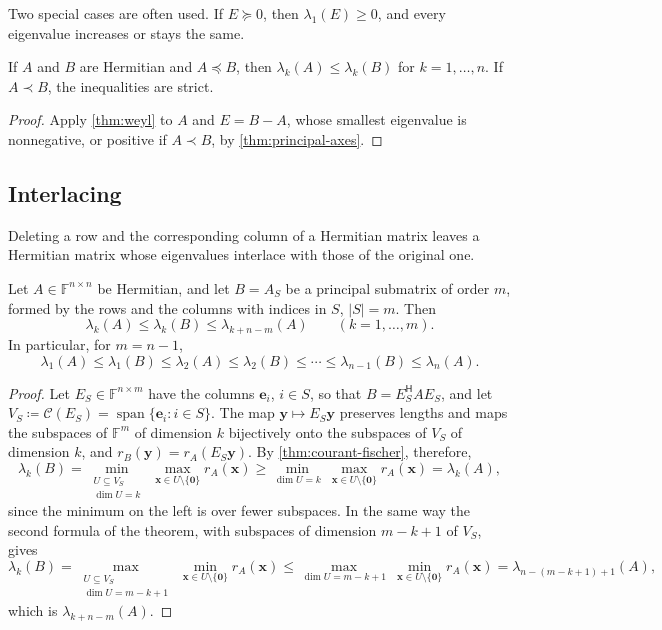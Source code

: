 Two special cases are often used. If $E\succeq0$, then $\lambda_1(E)\ge0$, and every eigenvalue increases or stays the same.

\begin{corollary}[Monotonicity]
\label{cor:monotone}
If $A$ and $B$ are Hermitian and $A\preceq B$, then $\lambda_k(A)\le\lambda_k(B)$ for $k=1,\ldots,n$. If $A\prec B$, the inequalities are strict.
\end{corollary}

\begin{proof}
Apply \cref{thm:weyl} to $A$ and $E=B-A$, whose smallest eigenvalue is nonnegative, or positive if $A\prec B$, by \cref{thm:principal-axes}.
\end{proof}

\subsection{Interlacing}

Deleting a row and the corresponding column of a Hermitian matrix leaves a Hermitian matrix whose eigenvalues interlace with those of the original one.

\begin{theorem}
\label{thm:interlacing}
Let $A\in\mathbb F^{n\times n}$ be Hermitian, and let $B=A_S$ be a principal submatrix of order $m$, formed by the rows and the columns with indices in $S$, $|S|=m$. Then
\[
\lambda_k(A)\le\lambda_k(B)\le\lambda_{k+n-m}(A)\qquad(k=1,\ldots,m).
\]
In particular, for $m=n-1$,
\[
\lambda_1(A)\le\lambda_1(B)\le\lambda_2(A)\le\lambda_2(B)\le\cdots\le\lambda_{n-1}(B)\le\lambda_n(A).
\]
\end{theorem}

\begin{proof}
Let $E_S\in\mathbb F^{n\times m}$ have the columns $\mathbf e_i$, $i\in S$, so that $B=E_S^{\mathsf H}AE_S$, and let $V_S\coloneqq\mathcal C(E_S)=\operatorname{span}\{\mathbf e_i:i\in S\}$. The map $\mathbf y\mapsto E_S\mathbf y$ preserves lengths and maps the subspaces of $\mathbb F^m$ of dimension $k$ bijectively onto the subspaces of $V_S$ of dimension $k$, and $r_B(\mathbf y)=r_A(E_S\mathbf y)$. By \cref{thm:courant-fischer}, therefore,
\[
\lambda_k(B)=\min_{\substack{U\subseteq V_S\\\dim U=k}}\ \max_{\mathbf x\in U\setminus\{\mathbf 0\}}r_A(\mathbf x)\ge\min_{\dim U=k}\ \max_{\mathbf x\in U\setminus\{\mathbf 0\}}r_A(\mathbf x)=\lambda_k(A),
\]
since the minimum on the left is over fewer subspaces. In the same way the second formula of the theorem, with subspaces of dimension $m-k+1$ of $V_S$, gives
\[
\lambda_k(B)=\max_{\substack{U\subseteq V_S\\\dim U=m-k+1}}\ \min_{\mathbf x\in U\setminus\{\mathbf 0\}}r_A(\mathbf x)\le\max_{\dim U=m-k+1}\ \min_{\mathbf x\in U\setminus\{\mathbf 0\}}r_A(\mathbf x)=\lambda_{n-(m-k+1)+1}(A),
\]
which is $\lambda_{k+n-m}(A)$.
\end{proof}

